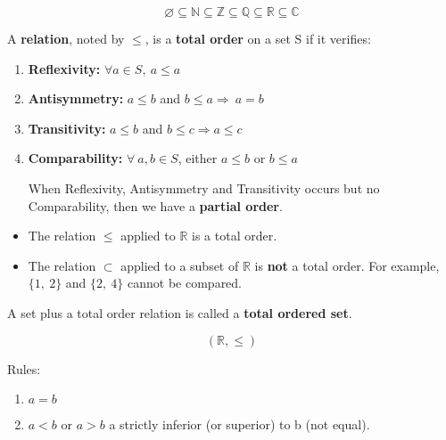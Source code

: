 \documentclass[12pt, a4paper]{book}
\begin{document}
\begin{rem}
  \[
    \varnothing \subseteq \mathbb{N} \subseteq \mathbb{Z} \subseteq \mathbb{Q} \subseteq \mathbb{R} \subseteq \mathbb{C}
  \]
\end{rem}

\begin{defn}
  \boldmath
  A \textbf{relation}, noted by $\leq $, is a \textbf{total order} on a set S if it verifies:
  \begin{enumerate}
    \item \textbf{Reflexivity:} $\forall a \in S, \ a \leq a$
    \item \textbf{Antisymmetry:} $a \leq b$ and $ b \leq a \Rightarrow \ a=b$
    \item \textbf{Transitivity:} $a \leq b$ and $b \leq c \Rightarrow a \leq c$
    \item \textbf{Comparability:} $\forall \ a, b \in S$, either $a \leq b$ or $b \leq a$
  
    When Reflexivity, Antisymmetry and Transitivity occurs but no Comparability, then we have a \textbf{partial order}.
  \end{enumerate}
  \unboldmath
\end{defn}

\begin{exmp}
  \begin{itemize}
    \item The relation $\leq$ applied to $\mathbb{R}$ is a total order.
    \item The relation $\subset$ applied to a subset of $\mathbb{R}$ is \textbf{not} a total order. For example, $\{1, \ 2\}$ and $\{2, \ 4\}$ cannot be compared.  
  \end{itemize}
\end{exmp}

\begin{defn}
  A set plus a total order relation is called a \textbf{total ordered set}.
\end{defn}

\begin{exmp}
  \[
    (\mathbb{R}, \leq)
  \]

  Rules:
  \begin{enumerate}
    \item $a=b$
    \item $a<b$ or $a>b$ a strictly inferior (or superior) to b (not equal).
  \end{enumerate}
\end{exmp}
\end{document}
